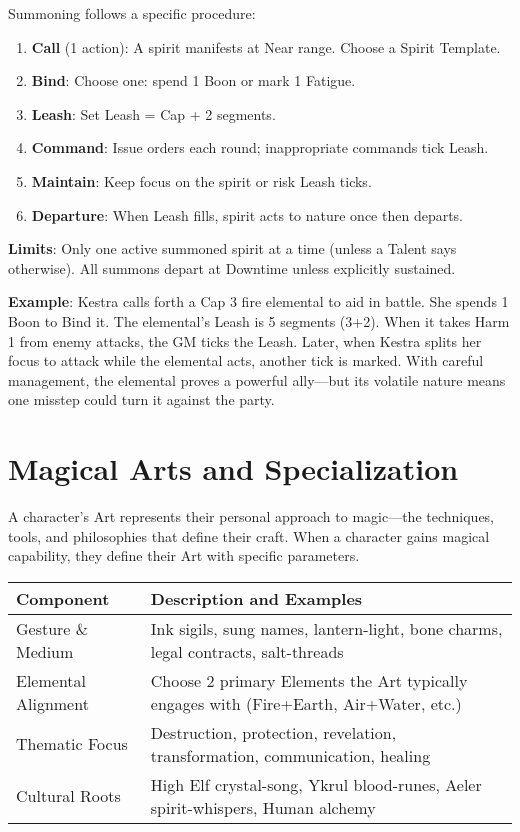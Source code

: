 Summoning follows a specific procedure:
\begin{enumerate}
    \item \textbf{Call} (1 action): A spirit manifests at Near range. Choose a Spirit Template.
    \item \textbf{Bind}: Choose one: spend 1 Boon or mark 1 Fatigue.
    \item \textbf{Leash}: Set Leash = Cap + 2 segments.
    \item \textbf{Command}: Issue orders each round; inappropriate commands tick Leash.
    \item \textbf{Maintain}: Keep focus on the spirit or risk Leash ticks.
    \item \textbf{Departure}: When Leash fills, spirit acts to nature once then departs.
\end{enumerate}

\textbf{Limits}: Only one active summoned spirit at a time (unless a Talent says otherwise). All summons depart at Downtime unless explicitly sustained.

\textbf{Example}: Kestra calls forth a Cap 3 fire elemental to aid in battle. She spends 1 Boon to Bind it. The elemental's Leash is 5 segments (3+2). When it takes Harm 1 from enemy attacks, the GM ticks the Leash. Later, when Kestra splits her focus to attack while the elemental acts, another tick is marked. With careful management, the elemental proves a powerful ally—but its volatile nature means one misstep could turn it against the party.

\section*{Magical Arts and Specialization}

A character's Art represents their personal approach to magic—the techniques, tools, and philosophies that define their craft. When a character gains magical capability, they define their Art with specific parameters.

\begin{fatebox}
\begin{tabularx}{\textwidth}{lX}
\toprule
\textbf{Component} & \textbf{Description and Examples} \\
\midrule
Gesture \& Medium & Ink sigils, sung names, lantern-light, bone charms, legal contracts, salt-threads \\
Elemental Alignment & Choose 2 primary Elements the Art typically engages with (Fire+Earth, Air+Water, etc.) \\
Thematic Focus & Destruction, protection, revelation, transformation, communication, healing \\
Cultural Roots & High Elf crystal-song, Ykrul blood-runes, Aeler spirit-whispers, Human alchemy \\
\bottomrule
\end{tabularx}
\end{fatebox}


